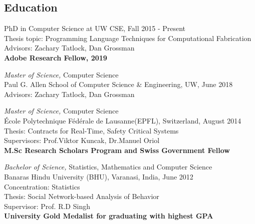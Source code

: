 \documentclass[margin, 10pt]{res} %
\begin{document}
\begin{resume}


\section{Education}

PhD in Computer Science at UW CSE, Fall 2015 - Present \\
Thesis topic: Programming Language Techniques for Computational Fabrication \\
Advisors: Zachary Tatlock, Dan Grossman\\
\textbf{Adobe Research Fellow, 2019}

{\sl Master of Science,} Computer Science \\
Paul G. Allen School of Computer Science \& Engineering, UW, June 2018 \\
Advisors: Zachary Tatlock, Dan Grossman

{\sl Master of Science,} Computer Science \\
\'{E}cole Polytechnique F\'{e}d\'{e}rale de Lausanne(EPFL), Switzerland, August 2014 \\
Thesis: Contracts for Real-Time, Safety Critical Systems \\Supervisors: Prof.Viktor Kuncak, Dr.Manuel Oriol\\
\textbf{M.Sc Research Scholars Program and Swiss Government Fellow}

{\sl Bachelor of Science,} Statistics, Mathematics and Computer Science \\
Banaras Hindu University (BHU), Varanasi, India, June 2012 \\
Concentration: Statistics \\
Thesis: Social Network-based Analysis of Behavior \\ Supervisor: Prof. R.D Singh\\
\textbf{University Gold Medalist for graduating with highest GPA}


\end{resume}
\end{document}
